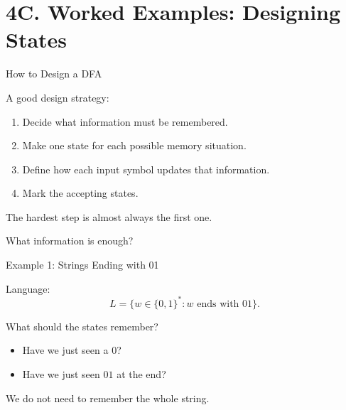 \documentclass[10pt,aspectratio=169]{beamer}
\begin{document}
\section{4C. Worked Examples: Designing States}

\begin{frame}{How to Design a DFA}

A good design strategy:

\begin{enumerate}
\item Decide what information must be remembered.
\item Make one state for each possible memory situation.
\item Define how each input symbol updates that information.
\item Mark the accepting states.
\end{enumerate}

\pause

The hardest step is almost always the first one.

\begin{center}
What information is enough?
\end{center}

\end{frame}

\begin{frame}{Example 1: Strings Ending with 01}

Language:
\[
L=\{w\in\{0,1\}^*: w\text{ ends with }01\}.
\]

\pause

What should the states remember?

\begin{itemize}
\item Have we just seen a $0$?
\item Have we just seen $01$ at the end?
\end{itemize}

\pause

We do not need to remember the whole string.

\end{frame}
\end{document}
